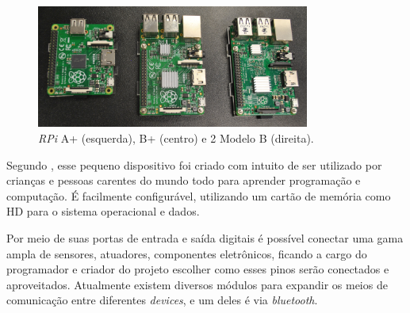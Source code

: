 \begin{figure}[htb]
	\caption{\label{fig:todos-rpi}\textit{RPi} A+ (esquerda), B+ (centro) e 2 Modelo B (direita).}
	\begin{center}
		\includegraphics[width=0.8\textwidth]{img/rpi-modelos.jpg}
	\end{center}
\end{figure}

\begin{table}[htb]
\end{table}

Segundo , esse pequeno dispositivo foi criado com intuito de ser utilizado por crianças e pessoas carentes do mundo todo para aprender programação e computação. É facilmente configurável, utilizando um cartão de memória como HD para o sistema operacional e dados.

Por meio de suas portas de entrada e saída digitais é possível conectar uma gama ampla de sensores, atuadores, componentes eletrônicos, ficando a cargo do programador e criador do projeto escolher como esses pinos serão conectados e aproveitados. Atualmente existem diversos módulos para expandir os meios de comunicação entre diferentes \textit{devices}, e um deles é via \textit{bluetooth}.

